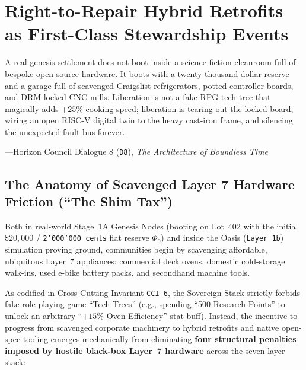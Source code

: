 \chapter{Right-to-Repair Hybrid Retrofits as First-Class Stewardship Events}
\label{ch:right-to-repair-stewardship}

\epigraph{A real genesis settlement does not boot inside a science-fiction cleanroom full of bespoke open-source hardware. It boots with a twenty-thousand-dollar reserve and a garage full of scavenged Craigslist refrigerators, potted controller boards, and DRM-locked CNC mills. Liberation is not a fake RPG tech tree that magically adds $+25\%$ cooking speed; liberation is tearing out the locked board, wiring an open RISC-V digital twin to the heavy cast-iron frame, and silencing the unexpected fault bus forever.}{---Horizon Council Dialogue 8 (\texttt{D8}), \textit{The Architecture of Boundless Time}}

\section{The Anatomy of Scavenged Layer 7 Hardware Friction (``The Shim Tax'')}
\label{sec:ch6-scavenged-friction}

Both in real-world Stage~1A Genesis Nodes (booting on Lot~402 with the initial $\$20{,}000$ / \texttt{2'000'000 cents} fiat reserve $\Phi_0$) and inside the Oasis (\texttt{Layer 1b}) simulation proving ground, communities begin by scavenging affordable, ubiquitous Layer~7 appliances: commercial deck ovens, domestic cold-storage walk-ins, used e-bike battery packs, and secondhand machine tools.

As codified in Cross-Cutting Invariant \texttt{CCI-6}, the Sovereign Stack strictly forbids fake role-playing-game ``Tech Trees'' (e.g., spending ``500 Research Points'' to unlock an arbitrary ``$+15\%$ Oven Efficiency'' stat buff). Instead, the incentive to progress from scavenged corporate machinery to hybrid retrofits and native open-spec tooling emerges mechanically from eliminating \textbf{four structural penalties imposed by hostile black-box Layer~7 hardware} across the seven-layer stack:

